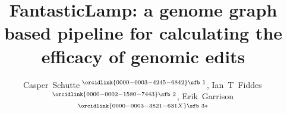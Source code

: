 \documentclass{bioinfo}
\theoremstyle{definition}
\begin{document}


\title[FantasticLamp]{FantasticLamp: a genome graph based pipeline for calculating the efficacy of genomic edits}
\author[Schutte \textit{et~al}.]{

Casper~Schutte\,$^{\orcidlink{0000-0003-4245-6842}\text{\sfb 1}}$,
Ian~T~Fiddes\,$^{\orcidlink{0000-0002-1580-7443}\text{\sfb 2}}$,
Erik~Garrison\,$^{\orcidlink{0000-0003-3821-631X}\text{\sfb 3}*}$
}

\address{
$^{\text{\sf 1}}$Department of Bioinformatics and Computational Biology, University of Stellenbosch, Stellenbosch, 7600, Western Cape, South Africa \\
$^{\text{\sf 2}}$10x Genomics, Pleasanton, CA \\
$^{\text{\sf 3}}$Department of Genetics, Genomics and Informatics, University of Tennessee Health Science Center, Memphis, 38163, Tennessee, USA \\
}



\end{document}
